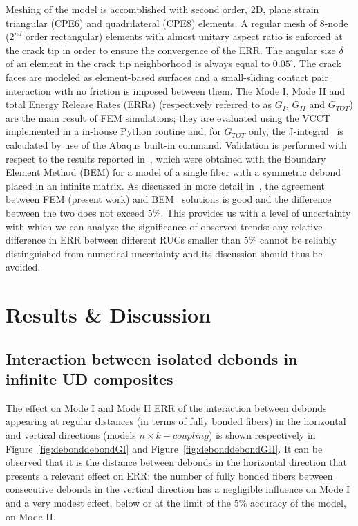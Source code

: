 \documentclass[smallextended]{svjour3}       %
\begin{document}
Meshing of the model is accomplished with second order, 2D, plane strain triangular (CPE6) and quadrilateral (CPE8) elements. A regular mesh of 8-node ($2^{nd}$ order rectangular) elements with almost unitary aspect ratio is enforced at the crack tip in order to ensure the convergence of the ERR. The angular size $\delta$ of an element in the crack tip neighborhood is always equal to $0.05^{\circ}$. The crack faces are modeled as element-based surfaces and a small-sliding contact pair interaction with no friction is imposed between them. The Mode I, Mode II and total Energy Release Rates (ERRs) (respectively referred to as $G_{I}$, $G_{II}$ and $G_{TOT}$) are the main result of FEM simulations; they are evaluated using the VCCT~\cite{Krueger2004} implemented in a in-house Python routine and, for $G_{TOT}$ only, the J-integral~\cite{Rice1968} is calculated by use of the Abaqus built-in command. Validation is performed with respect to the results reported in~\cite{Paris2007,Sandino2016}, which were obtained with the Boundary Element Method (BEM) for a model of a single fiber with a symmetric debond placed in an infinite matrix. As discussed in more detail in~\cite{DiStasio2019}, the agreement between FEM (present work) and BEM~\cite{Paris2007,Sandino2016} solutions is good and the difference between the two does not exceed $5\%$. This provides us with a level of uncertainty with which we can analyze the significance of observed trends: any relative difference in ERR between different RUCs smaller than $5\%$ cannot be reliably distinguished from numerical uncertainty and its discussion should thus be avoided.

\section{Results \& Discussion}\label{sec:results}

\subsection{Interaction between isolated debonds in infinite UD composites}\label{subsec:chesstable}

The effect on Mode I and Mode II ERR of the interaction between debonds appearing at regular distances (in terms of fully bonded fibers) in the horizontal and vertical directions (models $n\times k-coupling$) is shown respectively in Figure~\ref{fig:debonddebondGI} and Figure~\ref{fig:debonddebondGII}. It can be observed that it is the distance between debonds in the horizontal direction that presents a relevant effect on ERR: the number of fully bonded fibers between consecutive debonds in the vertical direction has a negligible influence on Mode I and a very modest effect, below or at the limit of the $5\%$ accuracy of the model, on Mode II.
\end{document}
